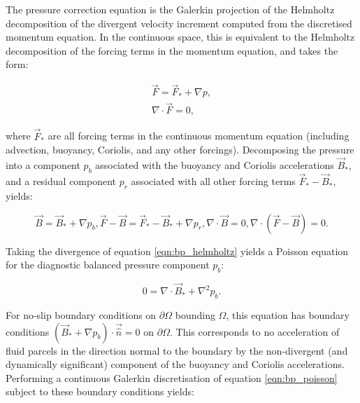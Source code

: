 The pressure correction equation is the Galerkin projection of the Helmholtz
decomposition of the divergent velocity increment computed from the discretised
momentum equation. In the continuous space, this is equivalent to the Helmholtz
decomposition of the forcing terms in the momentum equation, and takes the form:

\begin{align}
  \vec{F} = \vec{F}_* + \nabla p, \\
  \nabla \cdot \vec{F} = 0,
\end{align}

where $\vec{F}_*$ are all forcing terms in the continuous momentum equation
(including advection, buoyancy, Coriolis, and any other forcings).
Decomposing the pressure into a component $p_b$ associated with the buoyancy and
Coriolis accelerations $\vec{B}_*$, and a residual component $p_r$ associated with
all other forcing terms $\vec{F}_* - \vec{B}_*$, yields:

\begin{subequations}
  \begin{equation}\label{eqn:bp_helmholtz}
    \vec{B} = \vec{B}_* + \nabla p_b,
  \end{equation}
  \begin{equation}
    \vec{F} - \vec{B} = \vec{F}_* - \vec{B}_* + \nabla p_r,
  \end{equation}
  \begin{equation}
    \nabla \cdot \vec{B} = 0,
  \end{equation}
  \begin{equation}
    \nabla \cdot \left( \vec{F} - \vec{B} \right) = 0.
  \end{equation}
\end{subequations}

Taking the divergence of equation \eqref{eqn:bp_helmholtz} yields a Poisson equation for the diagnostic
balanced pressure component $p_b$:

\begin{equation}\label{eqn:bp_poisson}
  0 = \nabla \cdot \vec{B}_* + \nabla^2 p_b.
\end{equation}

For no-slip boundary conditions on $\partial \Omega$ bounding
$\Omega$, this equation has boundary conditions \linebreak 
$\left( \vec{B}_* + \nabla p_b \right) \cdot \vec{\hat{n}} = 0$ on $\partial \Omega$. This corresponds
to no acceleration of fluid parcels in the direction normal to the boundary
by the non-divergent (and dynamically significant) component of the buoyancy
and Coriolis accelerations. Performing a continuous Galerkin discretisation of equation
\eqref{eqn:bp_poisson} subject to these boundary conditions yields:

